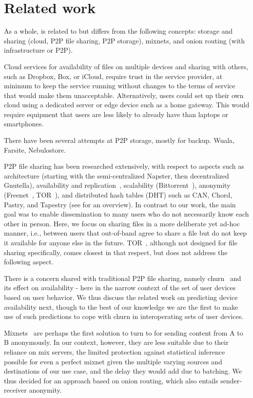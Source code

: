 \section{Related work}%
\label{RelatedWork}

As a whole, \name is related to but differs from the following concepts: storage and sharing (cloud, P2P file sharing, P2P storage),  mixnets, and onion routing (with infrastructure or P2P).  

Cloud services for availability of files on multiple devices and sharing with others, such as Dropbox, Box, or iCloud, require trust in the service provider, at minimum to keep the service running without changes to the terms of service that would make them unacceptable. Alternatively, users could set up their own cloud using a dedicated server or edge device such as a home gateway. This would require equipment that users are less likely to already have than laptops or smartphones. 

There have been several attempts at P2P storage, mostly for backup. Wuala, Farsite, Nebulostore.

P2P file sharing has been researched extensively, with respect to aspects such as architecture (starting with the semi-centralized Napster, then decentralized Gnutella), availability and replication~\cite{replica}, scalability (Bittorrent~\cite{bittorrent-incentives}), anonymity (Freenet~\cite{Clarke:2001}, TOR~\cite{Tor}), and distributed hash tables (DHT) such as CAN, Chord, Pastry, and Tapestry (see \cite{dhtchurn} for an overview). In contrast to our work, the main goal was to enable dissemination to many users who do not necessarily know each other in person. Here, we focus on sharing files in a more deliberate yet ad-hoc manner, i.e., between users that out-of-band agree to share a file but do not keep it available for anyone else in the future. TOR~\cite{Tor}, although not designed for file sharing specifically, comes closest in that respect, but does not address the following aspect.

There is a concern shared with traditional P2P file sharing, namely churn~\cite{dhtchurn} and its effect on availability - here in the narrow context of the set of user devices based on user behavior. We thus discuss the related work on predicting device availability next, though to the best of our knowledge we are the first to make use of such predictions to cope with churn in interoperating sets of user devices. 

Mixnets~\cite{Chaum:1981} are perhaps the first solution to turn to for sending content from A to B anonymously. In our context, however, they are less suitable due to their reliance on mix servers, the limited protection against statistical inference possible for even a perfect mixnet given the multiple varying sources and destinations of our use case, and the delay they would add due to batching. We thus decided for an approach based on onion routing, which also entails sender-receiver anonymity.

